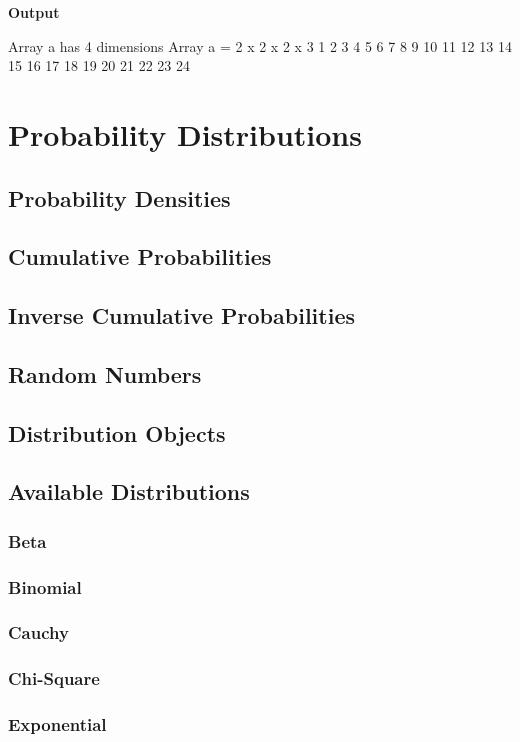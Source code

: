 \documentclass[12pt,a4paper]{article}
\begin{document}
 \textbf{Output} 
 
 \begin{myoutput}
 
Array a has 4 dimensions
Array a = 2 x 2 x 2 x 3
1 2 3 
4 5 6 
7 8 9 
10 11 12 
13 14 15 
16 17 18 
19 20 21 
22 23 24 
 

 \end{myoutput}



\section{Probability Distributions}
\subsection{Probability Densities}
\subsection{Cumulative Probabilities}
\subsection{Inverse Cumulative Probabilities}
\subsection{Random Numbers}
\subsection{Distribution Objects}
\subsection{Available Distributions}
\subsubsection{Beta}
\subsubsection{Binomial}
\subsubsection{Cauchy}
\subsubsection{Chi-Square}
\subsubsection{Exponential}
\end{document}
